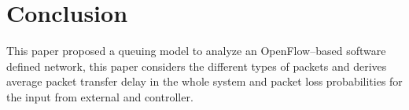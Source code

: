 \documentclass[12pt]{article}
\begin{document}
\section*{Conclusion}
This paper proposed a queuing model to analyze an OpenFlow–based software defined network, this paper considers the different types of packets and derives average packet transfer delay in the whole system and packet loss probabilities for the input from external and controller.
\end{document}
